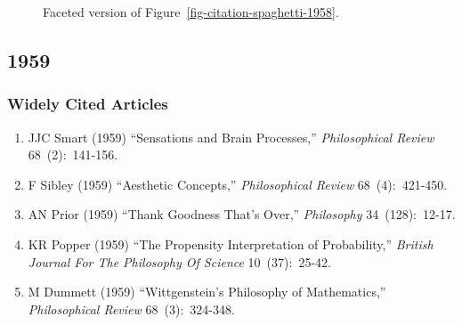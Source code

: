 \documentclass[
  10pt,
  letterpaper,
  DIV=11,
  numbers=noendperiod,
  twoside]{scrartcl}
\providecommand{\tightlist}{%
  \setlength{\itemsep}{0pt}\setlength{\parskip}{0pt}}\usepackage{longtable,booktabs,array}
\begin{document}
\begin{figure}


\caption{\label{fig-citation-facet-1958}Faceted version of
Figure~\ref{fig-citation-spaghetti-1958}.}

\end{figure}%

\newpage

\subsection{1959}\label{sec-s1959}

\subsubsection*{Widely Cited Articles}\label{widely-cited-articles-3}

\begin{enumerate}
\def\labelenumi{\arabic{enumi}.}
\tightlist
\item
  JJC Smart (1959) ``Sensations and Brain Processes,''
  \emph{Philosophical Review} 68~(2):~141-156.
\item
  F Sibley (1959) ``Aesthetic Concepts,'' \emph{Philosophical Review}
  68~(4):~421-450.
\item
  AN Prior (1959) ``Thank Goodness That's Over,'' \emph{Philosophy}
  34~(128):~12-17.
\item
  KR Popper (1959) ``The Propensity Interpretation of Probability,''
  \emph{British Journal For The Philosophy Of Science} 10~(37):~25-42.
\item
  M Dummett (1959) ``Wittgenstein's Philosophy of Mathematics,''
  \emph{Philosophical Review} 68~(3):~324-348.
\end{enumerate}
\end{document}
